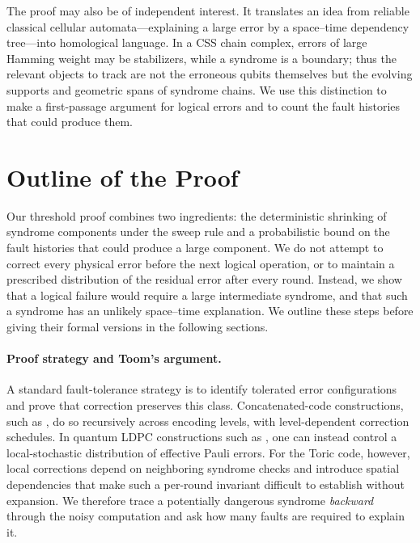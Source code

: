 The proof may also be of independent interest. It translates an idea from reliable classical cellular automata---explaining a large error by a space--time dependency tree---into homological language. In a CSS chain complex, errors of large Hamming weight may be stabilizers, while a syndrome is a boundary; thus the relevant objects to track are not the erroneous qubits themselves but the evolving supports and geometric spans of syndrome chains. We use this distinction to make a first-passage argument for logical errors and to count the fault histories that could produce them.

\section{Outline of the Proof}

Our threshold proof combines two ingredients: the deterministic shrinking of syndrome components under the sweep rule and a probabilistic bound on the fault histories that could produce a large component. We do not attempt to correct every physical error before the next logical operation, or to maintain a prescribed distribution of the residual error after every round. Instead, we show that a logical failure would require a large intermediate syndrome, and that such a syndrome has an unlikely space--time explanation. We outline these steps before giving their formal versions in the following sections.

\paragraph{Proof strategy and Toom's argument.}
A standard fault-tolerance strategy is to identify tolerated error configurations and prove that correction preserves this class. Concatenated-code constructions, such as \cite{aharonov1999faulttolerant}, do so recursively across encoding levels, with level-dependent correction schedules. In quantum LDPC constructions such as \cite{grospellier:tel-03364419}, one can instead control a local-stochastic distribution of effective Pauli errors. For the Toric code, however, local corrections depend on neighboring syndrome checks and introduce spatial dependencies that make such a per-round invariant difficult to establish without expansion. We therefore trace a potentially dangerous syndrome \emph{backward} through the noisy computation and ask how many faults are required to explain it.

